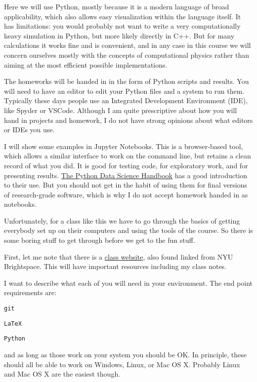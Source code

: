 Here we will use Python, mostly because it is a modern language of
broad applicability, which also allows easy visualization within the
language itself. It has limitations: you would probably not want to
write a very computationally heavy simulation in Python, but more
likely directly in C++. But for many calculations it works fine and is
convenient, and in any case in this course we will concern ourselves
mostly with the concepts of computational physics rather than aiming
at the most efficient possible implementations.

The homeworks will be handed in in the form of Python scripts and
results. You will need to have an editor to edit your Python files and
a system to run them. Typically these days people use an Integrated
Development Environment (IDE), like Spyder or VSCode. Although I am
quite prescriptive about how you will hand in projects and homework, I
do not have strong opinions about what editors or IDEs you use.

I will show some examples in Jupyter Notebooks.  This is a
browser-based tool, which allows a similar interface to work on the
command line, but retains a clean record of what you did. It is good
for testing code, for exploratory work, and for presenting
results. \href{https://github.com/jakevdp/PythonDataScienceHandbook/tree/de0cc6bd317012d50ab3dd06e3cf4e256de1973f/notebooks}{The
Python Data Science Handbook} has a good introduction to their
use. But you should not get in the habit of using them for final
versions of research-grade software, which is why I do not accept
homework handed in as notebooks.

Unfortunately, for a class like this we have to go through the basics
of getting everybody set up on their computers and using the tools of
the course. So there is some boring stuff to get through before we get
to the fun stuff. 

First, let me note that there is a
\href{https://blanton144.github.io/computational-ugrad/}{\color{red} class
  website}, also found linked from NYU Brightspace. This will have
important resources including my class notes.

I want to describe what each of you will need in your environment. The
end point requirements are:
\begin{ditemize}
\item {\tt git}
\item {\tt \LaTeX}
\item {\tt Python}
\end{ditemize}
and as long as those work on your system you should be OK. In
principle, these should all be able to work on Windows, Linux, or Mac
OS X. Probably Linux and Mac OS X are the easiest though.


